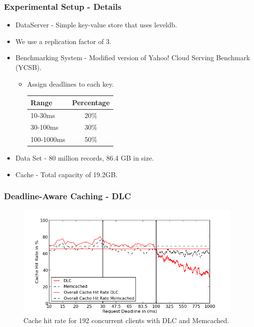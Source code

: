 \documentclass{beamer}
\begin{document}
\begin{frame}
  \frametitle{Experimental Setup - Details}
  \begin{itemize}
  \item DataServer - Simple key-value store that uses leveldb.
  \item We use a replication factor of 3.
  \item Benchmarking System - Modified version of Yahoo! Cloud Serving
    Benchmark (YCSB).
    \begin{itemize}
    \item Assign deadlines to each key.\\
      \begin{tabular}{| l | c |}
        \hline
        Range & Percentage \\ \hline
        10-30ms & 20\% \\ \hline
        30-100ms & 30\% \\ \hline
        100-1000ms & 50\% \\ \hline
      \end{tabular}
    \end{itemize}
  \item Data Set - 80 million records, 86.4 GB in size.
  \item Cache - Total capacity of 19.2GB.
  \end{itemize}
\end{frame}


\begin{frame}
  \frametitle{Deadline-Aware Caching - \textbf{DLC}}
  \begin{figure}[t]
    \begin{center}
      \centerline{\includegraphics[scale=0.5]{img/EC2/EC2_CS_MM/cache_48.png}}
      \caption{Cache hit rate for 192 concurrent clients with DLC and Memcached.}
      \label{fig:cache_192_cs_mm}
    \end{center}
  \end{figure}
\end{frame}
\end{document}
